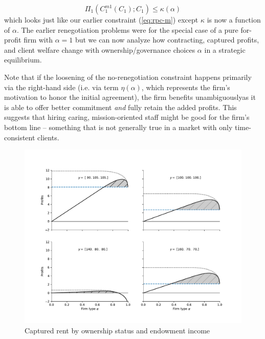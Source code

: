 \documentclass[11pt,english]{article}
\theoremstyle{plain}
\theoremstyle{definition}
\begin{document}
\begin{equation}
\Pi_{1}(C_{1}^{m1}(C_{1});C_{1})\leq\kappa(\alpha)\label{eq:no-kalpha}
\end{equation}
which looks just like our earlier constraint (\ref{eq:rpc-m}) except $\kappa$
is now a function of $\alpha$. The earlier renegotiation problems
were for the special case of a pure for-profit firm with $\alpha=1$
but we can now analyze how contracting, captured profits, and client welfare
change with ownership/governance choices  $\alpha$  in a strategic equilibrium.

Note that if the loosening of the no-renegotiation constraint
happens primarily via the right-hand side (i.e. via term $\eta\left(\alpha\right)$,
which represents the firm's motivation to honor the initial agreement),
the firm benefits unambiguously\textendash as it is able to offer better
commitment \emph{and} fully retain the added profits.
This suggests that hiring caring, mission-oriented staff might be good for the firm's bottom line -- something that is not generally true in a market with only time-consistent clients. 
\begin{figure}
\includegraphics[scale=0.75]{Figure3.pdf}
\caption{\label{fig:nonprofit}Captured rent by ownership status and endowment
income}
\end{figure}
\end{document}
